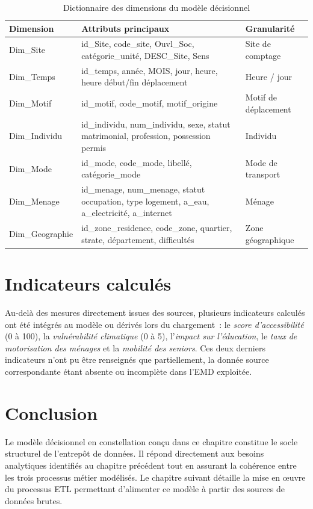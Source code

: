 \begin{table}[H]
\centering
\caption{Dictionnaire des dimensions du modèle décisionnel}
\begin{tabular}{p{2.6cm}p{6.8cm}p{3.6cm}}
\toprule
\textbf{Dimension} & \textbf{Attributs principaux} & \textbf{Granularité} \\
\midrule
Dim\_Site & id\_Site, code\_site, Ouvl\_Soc, catégorie\_unité, DESC\_Site, Sens & Site de comptage \\
Dim\_Temps & id\_temps, année, MOIS, jour, heure, heure début/fin déplacement & Heure / jour \\
Dim\_Motif & id\_motif, code\_motif, motif\_origine & Motif de déplacement \\
Dim\_Individu & id\_individu, num\_individu, sexe, statut matrimonial, profession, possession permis & Individu \\
Dim\_Mode & id\_mode, code\_mode, libellé, catégorie\_mode & Mode de transport \\
Dim\_Menage & id\_menage, num\_menage, statut occupation, type logement, a\_eau, a\_electricité, a\_internet & Ménage \\
Dim\_Geographie & id\_zone\_residence, code\_zone, quartier, strate, département, difficultés & Zone géographique \\
\bottomrule
\end{tabular}
\end{table}

\section{Indicateurs calculés}
Au-delà des mesures directement issues des sources, plusieurs indicateurs calculés ont été intégrés au modèle ou dérivés lors du chargement~: le \textit{score d'accessibilité} (0 à 100), la \textit{vulnérabilité climatique} (0 à 5), l'\textit{impact sur l'éducation}, le \textit{taux de motorisation des ménages} et la \textit{mobilité des seniors}. Ces deux derniers indicateurs n'ont pu être renseignés que partiellement, la donnée source correspondante étant absente ou incomplète dans l'EMD exploitée.

\section{Conclusion}
Le modèle décisionnel en constellation conçu dans ce chapitre constitue le socle structurel de l'entrepôt de données. Il répond directement aux besoins analytiques identifiés au chapitre précédent tout en assurant la cohérence entre les trois processus métier modélisés. Le chapitre suivant détaille la mise en œuvre du processus ETL permettant d'alimenter ce modèle à partir des sources de données brutes.

\clearpage
